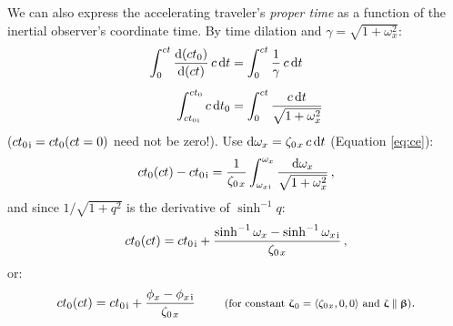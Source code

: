 \documentclass[12pt]{article}
\newcommand{\dd}[1]{\mathrm{d}#1}
\newcommand{\vvbeta}{\bm{\upbeta}}
\newcommand{\vvzeta}{\bm{\upzeta}}
\begin{document}
We can also express the accelerating traveler's \emph{proper time} as a function of the inertial observer's coordinate time. By time dilation and $\gamma = \sqrt{1 + \omega^2_x}$:
\begin{equation*}
\begin{aligned}
\int^{ct}_0 \dfrac{\dd (c t_0)}{\dd (ct)}  \, c \, \dd t &= \int^{ct}_0 \dfrac{1}{\gamma} \, c \, \dd t \\[5pt]
\int^{ct_0}_{ct_{0 \mkern1mu \mathrm{i}}} c \, \dd t_0 &= \int^{ct}_0 \dfrac{c \, \dd t}{\sqrt{1 + \omega^2_x}}
\end{aligned}
\end{equation*}
($ct_{0 \mkern2mu \mathrm{i}} = ct_0 (ct = 0)$ need not be zero!). Use $\dd \omega_x = \zeta_{0 \mkern2mu x} \, c \, \dd t$ (Equation \ref{eq:ce}):
\begin{equation*}
ct_0 (ct) - ct_{0 \mkern2mu \mathrm{i}} = \dfrac{1}{\zeta_{0 \mkern2mu x}} \int^{\omega_x}_{\omega_{x \mkern1mu \textrm{i} }} \dfrac{\dd \omega_x}{\sqrt{1 + \omega^2_x}} \, ,
\end{equation*}
and since $1/\sqrt{1 + q^2}$ is the derivative of $\sinh^{-1} q$:
\begin{equation*}
ct_0 (ct) = ct_{0 \mkern2mu \mathrm{i}} + \dfrac{\sinh^{-1} \omega_x - \sinh^{-1} \omega_{x \mkern2mu \textrm{i} }}{ \zeta_{0 \mkern2mu x}} \, ,
\end{equation*}
or:
\begin{equation}\label{eq:pt}
ct_0 (ct) = ct_{0 \mkern2mu \mathrm{i}} + \dfrac{ \phi_x - \phi_{x \mkern2mu \mathrm{i} }}{ \zeta_{0 \mkern2mu x}}  \qquad \textrm{\footnotesize{ (for constant $\vvzeta_{\mkern1mu 0} = \langle \zeta_{0 \mkern1mu x} , 0, 0 \rangle$ and $\vvzeta \parallel \vvbeta$)}}.
\end{equation}
\end{document}
